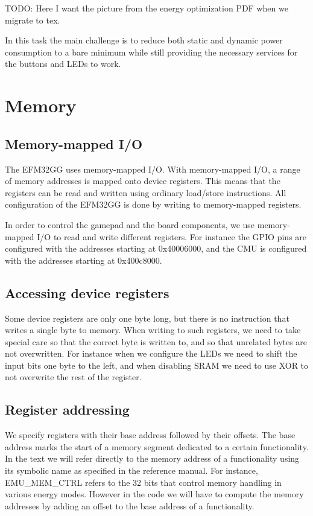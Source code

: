 TODO: Here I want the picture from the energy optimization PDF when we migrate to tex.

In this task the main challenge is to reduce both static and dynamic power consumption to a bare minimum while still providing the necessary services for the buttons and LEDs to work.





\section{Memory}

\subsection{Memory-mapped I/O}
The EFM32GG uses memory-mapped I/O. With memory-mapped I/O, a range of memory addresses is mapped onto device registers. This means that the registers can be read and written using ordinary load/store instructions. All configuration of the EFM32GG is done by writing to memory-mapped registers. 

In order to control the gamepad and the board components, we use memory-mapped I/O to read and write different registers. For instance the GPIO pins are configured with the addresses starting at 0x40006000, and the CMU is configured with the addresses starting at 0x400c8000.

\subsection{Accessing device registers}
Some device registers are only one byte long, but there is no instruction that writes a single byte to memory. When writing to such registers, we need to take special care so that the correct byte is written to, and so that unrelated bytes are not overwritten. For instance when we configure the LEDs we need to shift the input bits one byte to the left, and when disabling SRAM we need to use XOR to not overwrite the rest of the register.

\subsection{Register addressing}
We specify registers with their base address followed by their offsets. The base address marks the start of a memory segment dedicated to a certain functionality. In the text we will refer directly to the memory address of a functionality using its symbolic name as specified in the reference manual. For instance, EMU\_MEM\_CTRL refers to the 32 bits that control memory handling in various energy modes. However in the code we will have to compute the memory addresses by adding an offset to the base address of a functionality.







